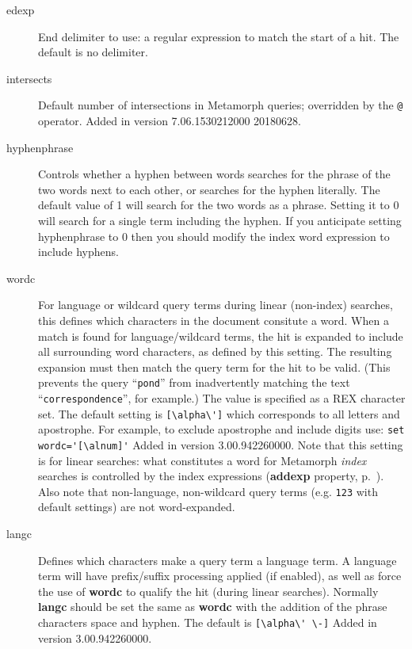 \begin{description}
\item[edexp]  End delimiter to use: a regular expression to match
the start of a hit.  The default is no delimiter.

\item[intersects] Default number of intersections in Metamorph
  queries; overridden by the \verb`@` operator.  Added in version
  7.06.1530212000 20180628.

\item[hyphenphrase]  Controls whether a hyphen between words searches
for the phrase of the two words next to each other, or searches for
the hyphen literally.  The default value of 1 will search for the two
words as a phrase.  Setting it to 0 will search for a single term
including the hyphen.  If you anticipate setting hyphenphrase to 0 then
you should modify the index word expression to include hyphens.

\item[wordc] For language or wildcard query terms during linear
  (non-index) searches, this defines which characters in the document
  consitute a word.  When a match is found for language/wildcard
  terms, the hit is expanded to include all surrounding word
  characters, as defined by this setting.  The resulting expansion
  must then match the query term for the hit to be valid.  (This
  prevents the query ``\verb`pond`'' from inadvertently matching the
  text ``\verb`correspondence`'', for example.)  The value is
  specified as a REX character set.  The default setting is
  \verb|[\alpha\']| which corresponds to all letters and apostrophe.
  For example, to exclude apostrophe and include digits use:
  \verb|set wordc='[\alnum]'| Added in version 3.00.942260000.  Note
  that this setting is for linear searches: what constitutes a word
  for Metamorph {\em index} searches is controlled by the index
  expressions ({\bf addexp} property, p.~\pageref{addexpSqlProperty}).
  Also note that non-language, non-wildcard query terms (e.g.
  \verb`123` with default settings) are not word-expanded.

\item[langc] Defines which characters make a query term a language
  term.  A language term will have prefix/suffix processing applied
  (if enabled), as well as force the use of {\bf wordc} to qualify the
  hit (during linear searches).  Normally {\bf langc} should be set
  the same as {\bf wordc} with the addition of the phrase characters
  space and hyphen.  The default is \verb|[\alpha\' \-]| Added in
  version 3.00.942260000.


\end{description}
